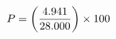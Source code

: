 \documentclass[preview]{standalone}
\begin{document}
\begin{align*}
\special{dvisvgm:raw <g id='unique000'>}P = \left( \frac{4.941}{28.000} \right) \times 100\\\special{dvisvgm:raw </g>}
\end{align*}
\end{document}
